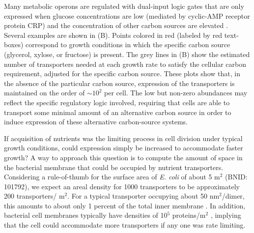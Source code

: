 Many metabolic operons are regulated with dual-input logic gates that are only
expressed when glucose concentrations are low (mediated by cyclic-AMP receptor
protein CRP) and the concentration of other carbon sources are elevated
\citep{gama-castro2016, zhang2014a, gama-castro2016, belliveau2018, ireland2020}.
Several examples are shown in (B). Points colored in red
(labeled by red text-boxes) correspond to growth conditions in which the
specific carbon source (glycerol, xylose, or fructose) is present. The grey
lines in (B) show the estimated number of transporters needed
at each growth rate to satisfy the cellular carbon requirement, adjusted for the
specific carbon source. These plots show that, in the absence of the particular
carbon source, expression of the transporters is maintained on the order of
$\sim 10^2$ per cell.
The low but non-zero abundances may  reflect the specific regulatory logic
involved, requiring that cells are able to transport some minimal amount of an
alternative carbon source in order to induce expression of these alternative
carbon-source systems.

If acquisition of nutrients was the limiting process in cell division under
typical growth conditions, could expression simply be increased to accommodate
faster growth? A way to approach this question is to compute the amount of space
in the bacterial membrane that could be occupied by nutrient transporters.
Considering a rule-of-thumb for the surface area of \textit{E. coli} of about 5
\textmu m$^2$ (BNID: 101792), we expect an areal density for 1000 transporters
to be approximately 200 transporters/ \textmu m$^2$. For a typical transporter
occupying about 50 nm$^2$/dimer, this amounts to about only 1 percent of the
total inner membrane \citep{szenk2017}. In addition, bacterial cell membranes
typically have densities of 10$^5$ proteins/\textmu m$^2$ \citep{phillips2018},
implying that the cell could accommodate more transporters if any one was rate limiting.
%

